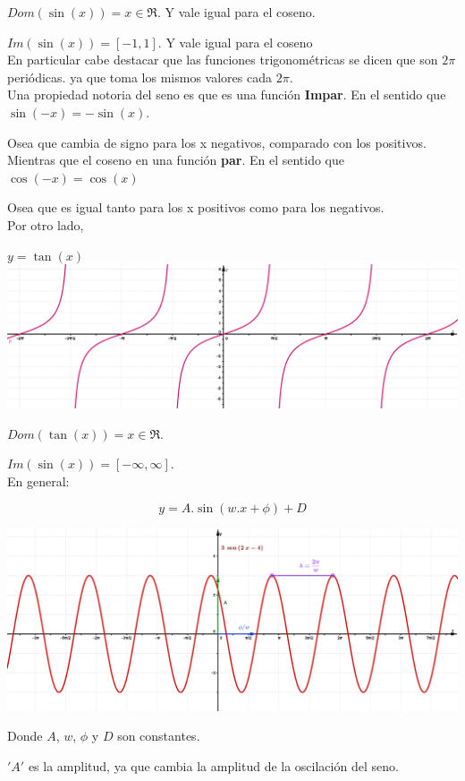\documentclass[a4paper,11pt,spanish,sans]{exam}
\begin{document}
$Dom(\sin (x))= x \in \Re $. Y vale igual para el coseno.

$Im(\sin (x))= [-1,1]$. Y vale igual para el coseno\\

En particular cabe destacar que las funciones trigonométricas se dicen que son $2\pi$ periódicas. ya que toma los mismos valores cada $2\pi$.\\

Una propiedad notoria del seno es que es una función \textbf{Impar}. En el sentido que $\sin(-x)=-\sin(x)$.

Osea que cambia de signo  para los x  negativos, comparado con los positivos.\\

Mientras que el coseno en una función \textbf{par}. En el sentido que $\cos (-x)=\cos (x)$

Osea que es igual tanto para los x positivos como para los negativos.\\

Por otro lado, 

$y=\tan (x)$  \includegraphics[width=0.5\linewidth]{tan.png}

$Dom(\tan (x))= x \in \Re $. %

$Im(\sin (x))= [-\infty,\infty]$. \\

En general: 

\[
y=A.\sin (w.x + \phi)+D
\]

\includegraphics[width=0.5\linewidth]{singeneral.png}
\begin{flushright}
Donde $A$, $w$, $\phi$ y $D$ son constantes.
\end{flushright}

$'A'$ es la amplitud, ya que cambia la amplitud de la oscilación del seno.
\end{document}
